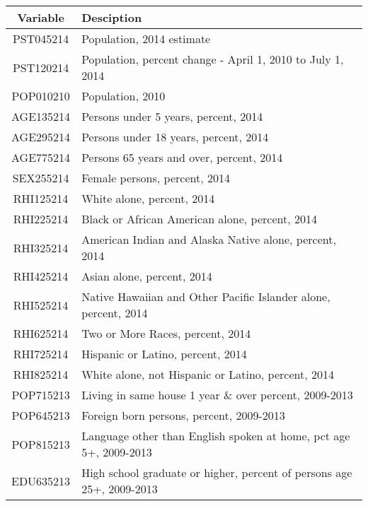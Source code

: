 \small{
\begin{tabularx}{\linewidth}[H]{@{}cX@{}}
	\caption{Example of an table}\\
	\toprule
	\textbf{Variable} & \textbf{Desciption} \\[6pt]
	\midrule
	\endhead
	PST045214 & Population, 2014 estimate                                              \\
	PST120214 & Population, percent change - April 1, 2010 to July 1, 2014             \\
	POP010210 & Population, 2010                                                       \\
	AGE135214 & Persons under 5 years, percent, 2014                                   \\
	AGE295214 & Persons under 18 years, percent, 2014                                  \\
	AGE775214 & Persons 65 years and over, percent, 2014                               \\
	SEX255214 & Female persons, percent, 2014                                          \\
	RHI125214 & White alone, percent, 2014                                             \\
	RHI225214 & Black or African American alone, percent, 2014                         \\
	RHI325214 & American Indian and Alaska Native alone, percent, 2014                 \\
	RHI425214 & Asian alone, percent, 2014                                             \\
	RHI525214 & Native Hawaiian and Other Pacific Islander alone, percent, 2014        \\
	RHI625214 & Two or More Races, percent, 2014                                       \\
	RHI725214 & Hispanic or Latino, percent, 2014                                      \\
	RHI825214 & White alone, not Hispanic or Latino, percent, 2014                     \\
	POP715213 & Living in same house 1 year \& over percent, 2009-2013                \\
	POP645213 & Foreign born persons, percent, 2009-2013                               \\
	POP815213 & Language other than English spoken at home, pct age 5+, 2009-2013      \\
	EDU635213 & High school graduate or higher, percent of persons age 25+, 2009-2013  \\

\end{tabularx}}
